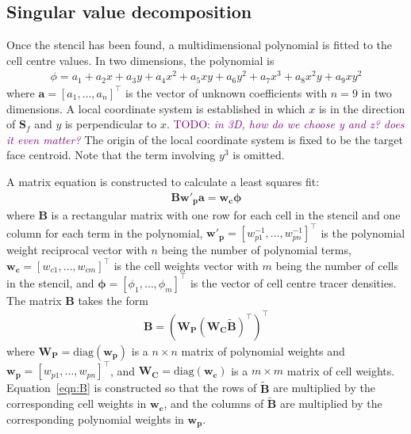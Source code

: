 \documentclass{article}
\newcommand{\TODO}[1]{\textcolor{purple}{TODO: \emph{#1}}}
\begin{document}
\subsection{Singular value decomposition}
Once the stencil has been found, a multidimensional polynomial is fitted to the cell centre values.
In two dimensions, the polynomial is
\begin{align}
	\phi = a_1 + a_2 x + a_3 y + a_4 x^2 + a_5 xy + a_6 y^2 + a_7 x^3 + a_8 x^2 y + a_9 x y^2
\end{align}
where $\mathbf{a} = [a_1, \ldots, a_n]^\intercal$ is the vector of unknown coefficients with $n=9$ in two dimensions.  A local coordinate system is established in which $x$ is in the direction of $\mathbf{S}_f$ and $y$ is perpendicular to $x$.
\TODO{in 3D, how do we choose y and z? does it even matter?}
The origin of the local coordinate system is fixed to be the target face centroid.
Note that the term involving $y^3$ is omitted.

A matrix equation is constructed to calculate a least squares fit:
\begin{align}
	\mathbf{B} \mathbf{w'_p} \mathbf{a} = \mathbf{w_c} \bm{\phi}
\end{align}
where $\mathbf{B}$ is a rectangular matrix with one row for each cell in the stencil and one column for each term in the polynomial, $\mathbf{w'_p} = [w_{p1}^{-1}, \ldots, w_{pn}^{-1}]^\intercal$ is the polynomial weight reciprocal vector with $n$ being the number of polynomial terms,  $\mathbf{w_c} = [w_{c1}, \ldots, w_{cm}]^\intercal$ is the cell weights vector with $m$ being the number of cells in the stencil, and $\bm{\phi} = [\phi_1, \ldots, \phi_m]^\intercal$ is the vector of cell centre tracer densities.
The matrix $\mathbf{B}$ takes the form
\begin{align}
	\mathbf{B} = \left( \mathbf{W_P} \left( \mathbf{W_C} \mathbf{\tilde{B}} \right)^\intercal \right)^\intercal \label{eqn:B}
\end{align}
where $\mathbf{W_P} = \mathrm{diag}(\mathbf{w_p})$ is a $n \times n$ matrix of polynomial weights and $\mathbf{w_p} = [w_{p1}, \ldots, w_{pn}]^\intercal$, and $\mathbf{W_C} = \mathrm{diag}(\mathbf{w_c})$ is a $m \times m$ matrix of cell weights.  Equation~\ref{eqn:B} is constructed so that the rows of $\mathbf{\tilde{B}}$ are multiplied by the corresponding cell weights in $\mathbf{w_c}$, and the columns of $\mathbf{\tilde{B}}$ are multiplied by the corresponding polynomial weights in $\mathbf{w_p}$.
\end{document}

